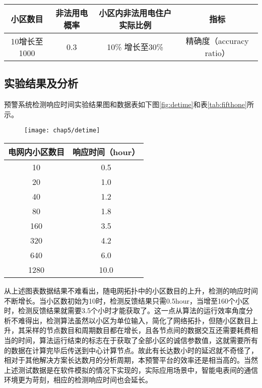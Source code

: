 \begin{table}[!hpb]
  \centering
  \begin{tabular}{|c|c|c|c|}
  \hline
  小区数目 & 非法用电概率 & 小区内非法用电住户实际比例 & 指标\\
  \hline
  10增长至1000 & 0.3 & 10\% 增长至30\% & 精确度（accuracy ratio）\\
  \hline
  \end{tabular}
\end{table}

\subsection{实验结果及分析}

预警系统检测响应时间实验结果图和数据表如下图\ref{fig:detime}和表\ref{tab:fifthone}所示。
\begin{figure}[!htp]
  \centering
    \texttt{[image: chap5/detime]}
\end{figure}

\begin{table}[!hpb]
  \centering
  \begin{tabular}{|c|c|}
  \hline
  电网内小区数目 & 响应时间（hour）\\
  \hline
  10 & 0.5\\
  \hline
  20 & 1.0\\
  \hline
  40 & 1.2\\
  \hline
  80 & 1.8\\
  \hline
  160 & 3.5\\
  \hline
  320 & 4.2\\
  \hline
  640 & 6.0\\
  \hline
  1280 & 10.0\\
  \hline
  \end{tabular}
\end{table}

从上述图表数据结果不难看出，随电网拓扑中的小区数目的上升，检测的响应时间不断增长。当小区数初始为10时，检测反馈结果只需0.5hour，当增至160个小区时，检测反馈结果就需要3.5个小时才能获取了。这一点从算法的运行效率角度分析不难得出，检测算法虽然以小区为单位输入，简化了网络拓扑，但随小区数目上升，其采样的节点数目和周期数目都在增长，且各节点间的数据交互还需要耗费相当的时间，算法运行结束的标志在于获取了全部小区的诚信参数值，这就需要所有的数据在计算完毕后传送到中心计算节点。故此有长达数小时的延迟就不奇怪了，相对于其他解决方案长达数月的分析周期，本预警平台的效率还是相当高的。当然上述测试数据是在软件模拟的情况下实现的，实际应用场景中，智能电表间的通信环境更为苛刻，相应的检测响应时间也会延长。


